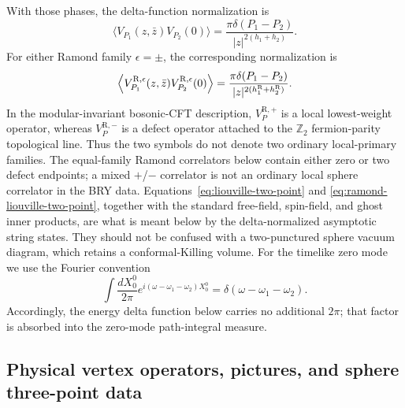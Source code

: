 \documentclass[11pt]{article}
\begin{document}
With those phases, the delta-function normalization is
\begin{equation}
 \langle V_{P_1}(z,\bar z)V_{P_2}(0)\rangle
 =\frac{\pi\delta(P_1-P_2)}
 {|z|^{2(h_1+h_2)}}.
 \label{eq:liouville-two-point}
\end{equation}
For either Ramond family $\epsilon=\pm$, the corresponding normalization is
\begin{equation}
 \left\langle
 V_{P_1}^{\mathrm R,\epsilon}(z,\bar z)
 V_{P_2}^{\mathrm R,\epsilon}(0)
 \right\rangle
 =\frac{\pi\delta(P_1-P_2)}
 {|z|^{2(h^{\rm R}_1+h^{\rm R}_2)}}.
 \label{eq:ramond-liouville-two-point}
\end{equation}
In the modular-invariant bosonic-CFT description,
$V_P^{\mathrm R,+}$ is a local lowest-weight operator, whereas
$V_P^{\mathrm R,-}$ is a defect operator attached to the $\mathbb Z_2$
fermion-parity topological line.  Thus the two symbols do not denote two
ordinary local-primary families.  The equal-family Ramond correlators below
contain either zero or two defect endpoints; a mixed $+$/$-$ correlator is
not an ordinary local sphere correlator in the BRY data.
Equations~\eqref{eq:liouville-two-point} and
\eqref{eq:ramond-liouville-two-point}, together with the standard free-field,
spin-field, and ghost inner products, are what is meant below by the
delta-normalized asymptotic string states.  They should not be confused with
a two-punctured sphere vacuum diagram, which retains a conformal-Killing
volume.
For the timelike zero mode we use the Fourier convention
\begin{equation}
 \int\frac{dX_0^0}{2\pi}
 e^{i(\omega-\omega_1-\omega_2)X_0^0}
 =\delta(\omega-\omega_1-\omega_2).
 \label{eq:timelike-zero-mode-normalization}
\end{equation}
Accordingly, the energy delta function below carries no additional $2\pi$;
that factor is absorbed into the zero-mode path-integral measure.

\subsection{Physical vertex operators, pictures, and sphere three-point data}
\end{document}
